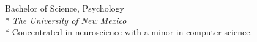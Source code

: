 \documentclass[]{friggeri-cv} %
\begin{document}
\begin{description}
  \item  {\largeheaderfont Bachelor of Science, Psychology } \hfill
    { }\\*
    {\footnotesize \emph{The University of New Mexico  }} \\*
    Concentrated in neuroscience with a minor in computer science.
\end{description}

\iftoggle{cv}{
\section{research/work experience}
}{
\section{selected research/work experience}
}
\end{document}
